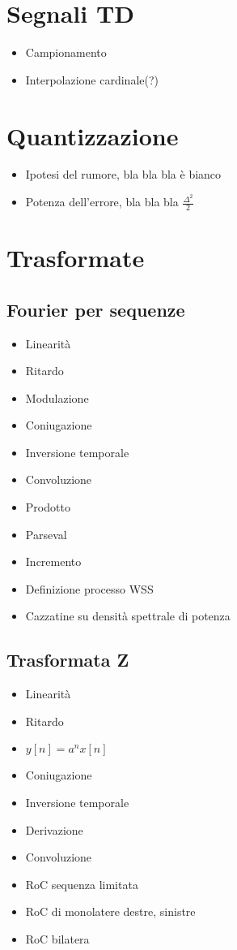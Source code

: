 \documentclass[11pt]{article}
\date{\today}
\title{}
\begin{document}
\tableofcontents

\section{Segnali TD}
\label{sec:org2399046}
\begin{itemize}
\item Campionamento
\item Interpolazione cardinale(?)
\end{itemize}

\section{Quantizzazione}
\label{sec:org4f0a955}
\begin{itemize}
\item Ipotesi del rumore, bla bla bla è bianco
\item Potenza dell'errore, bla bla bla \(\frac{\Delta ^2}{2}\)
\end{itemize}

\section{Trasformate}
\label{sec:orgc4070cb}
\subsection{Fourier per sequenze}
\label{sec:orgdc31610}
\begin{itemize}
\item Linearità
\item Ritardo
\item Modulazione
\item Coniugazione
\item Inversione temporale
\item Convoluzione
\item Prodotto
\item Parseval
\item Incremento
\item Definizione processo WSS
\item Cazzatine su densità spettrale di potenza
\end{itemize}
\subsection{Trasformata Z}
\label{sec:orgbd345cf}
\begin{itemize}
\item Linearità
\item Ritardo
\item \(y[n] = a^n x[n]\)
\item Coniugazione
\item Inversione temporale
\item Derivazione
\item Convoluzione
\item RoC sequenza limitata
\item RoC di monolatere destre, sinistre
\item RoC bilatera
\end{itemize}
\end{document}
